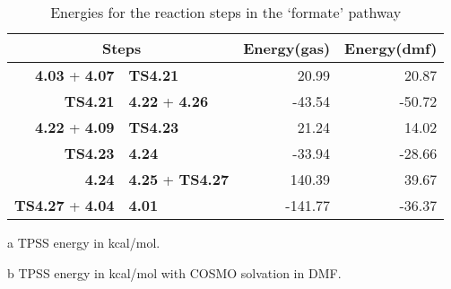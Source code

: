 \begin{table}[!htb]
\centering
 \begin{threeparttable}
  \caption{Energies for the reaction steps in the `formate' pathway}
    \begin{tabular}{r@{ $\rightarrow$ }lrr}
    \toprule
    \multicolumn{2}{c}{Steps} & Energy(gas)\tnote{a} & Energy(dmf)\tnote{b} \\
    \midrule
    \textbf{4.03} + \textbf{4.07} & \textbf{TS4.21} & 20.99 & 20.87 \\
    \textbf{TS4.21} & \textbf{4.22} + \textbf{4.26} & -43.54 & -50.72 \\
    \textbf{4.22} + \textbf{4.09} & \textbf{TS4.23} & 21.24 & 14.02 \\
    \textbf{TS4.23} & \textbf{4.24} & -33.94 & -28.66 \\
    \textbf{4.24} & \textbf{4.25} + \textbf{TS4.27} & 140.39 & 39.67 \\
    \textbf{TS4.27} + \textbf{4.04} & \textbf{4.01} & -141.77 & -36.37 \\
    \bottomrule
    \end{tabular}%
    \begin{tablenotes}
    \item [a] TPSS energy in kcal/mol.
    \item [b] TPSS energy in kcal/mol with COSMO solvation in DMF.
    \end{tablenotes}
  \label{tab.formrxn}%
 \end{threeparttable}
\end{table}%

